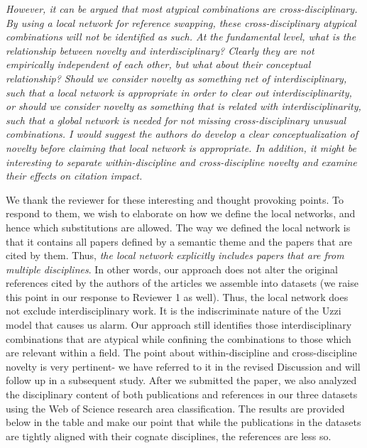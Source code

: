 \documentclass[11pt, oneside]{article}   	%
\begin{document}
\emph{However, it can be argued that most atypical combinations are cross-disciplinary.  By using a local network for reference swapping, these cross-disciplinary atypical combinations will not be identified as such.  At the fundamental level, what is the relationship between novelty and interdisciplinary?  Clearly they are not empirically independent of each other, but what about their conceptual relationship?  Should we consider novelty as something net of interdisciplinary, such that a local network is appropriate in order to clear out interdisciplinarity, or should we consider novelty as something that is related with interdisciplinarity, such that a global network is needed for not missing cross-disciplinary unusual combinations.  I would suggest the authors do develop a clear conceptualization of novelty before claiming that local network is appropriate.  In addition, it might be interesting to separate within-discipline and cross-discipline novelty and examine their effects on citation impact.}

We thank the reviewer for these interesting and thought provoking points. To respond to them, we  wish to elaborate on how we define the local networks, and hence which substitutions are allowed. The way we defined the local network is that it contains all papers defined by a semantic theme and the papers that are cited by them. Thus, \emph{the local network explicitly includes papers that are from multiple disciplines}. In other words, our approach does not alter the original references cited by the authors of the articles we assemble into datasets (we raise this point in our response to Reviewer 1 as well). Thus, the local network does not exclude interdisciplinary work. It is the indiscriminate nature of the Uzzi model that causes us alarm.  Our approach still identifies those interdisciplinary combinations that are atypical while confining the combinations to those which are relevant within a field.  The point about within-discipline and cross-discipline novelty is very pertinent- we have referred to it in the revised Discussion and will follow up in a subsequent study. After we submitted the paper, we also analyzed the disciplinary content of both publications and references in our three datasets using the Web of Science research area classification. The results are provided below in the table and make our point that while the publications in the datasets are tightly aligned with their cognate disciplines, the references are less so. \newpage
\end{document}
